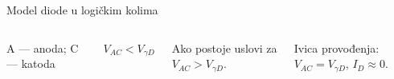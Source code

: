 \begin{frame}[label=10-s002]{Model diode u logičkim kolima}
\setlength{\abovedisplayskip}{4pt}\setlength{\belowdisplayskip}{4pt}\setlength{\abovedisplayshortskip}{3pt}\setlength{\belowdisplayshortskip}{3pt}
\begin{columns}[T,onlytextwidth]\centering
\par\medskip
A — anoda; C — katoda\par\bigskip
{}\medskip
\par
$V_{AC}<V_{\gamma D}$\centering {}\medskip
\par\medskip
Ako postoje uslovi za $V_{AC}>V_{\gamma D}$.\par\medskip
Ivica provođenja: $V_{AC}=V_{\gamma D}$, $I_D\approx0$.\end{columns}\bigskip
{}
\end{frame}
